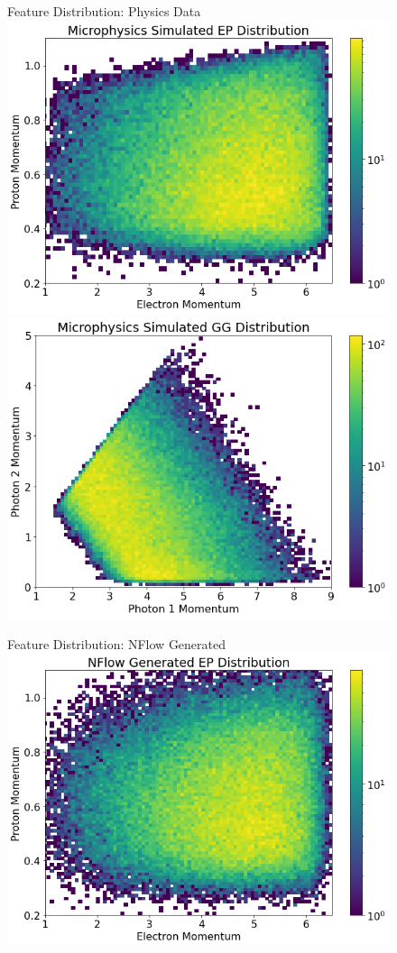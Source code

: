 \begin{figure}[!ht]
    \centering
    \begin{minipage}{.4\textwidth}
    Feature Distribution: Physics Data
        \centering
        \includegraphics[width=.9\textwidth,trim={0 0 0 0},clip]{pictures/milestoneR2/gemc1.png}
        \includegraphics[width=.9\textwidth,trim={0 0 0 0},clip]{pictures/milestoneR2/gemc2.png}
    \end{minipage}%
    \begin{minipage}{0.4\textwidth}
    Feature Distribution: NFlow Generated
        \centering
        \includegraphics[width=.9\textwidth,trim={0 0 0 0},clip]{pictures/milestoneR2/nflow1.png}

\end{minipage}
\end{figure}
